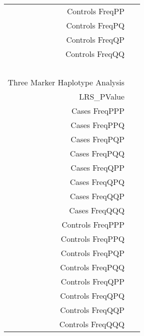 \begin{supertabular}{r p{5in}}
    Controls FreqPP  &  \\
    Controls FreqPQ  &  \\
    Controls FreqQP  &  \\
    Controls FreqQQ  &  \\
  ~ & ~ \\
  Three Marker Haplotype Analysis & ~ \\
    LRS\_PValue  &  \\
    Cases FreqPPP  &  \\
    Cases FreqPPQ  &  \\
    Cases FreqPQP  &  \\
    Cases FreqPQQ  &  \\
    Cases FreqQPP  &  \\
    Cases FreqQPQ  &  \\
    Cases FreqQQP  &  \\
    Cases FreqQQQ  &  \\
    Controls FreqPPP  &  \\
    Controls FreqPPQ  &  \\
    Controls FreqPQP  &  \\
    Controls FreqPQQ  &  \\
    Controls FreqQPP  &  \\
    Controls FreqQPQ  &  \\
    Controls FreqQQP  &  \\
    Controls FreqQQQ  &  \\
\end{supertabular} 